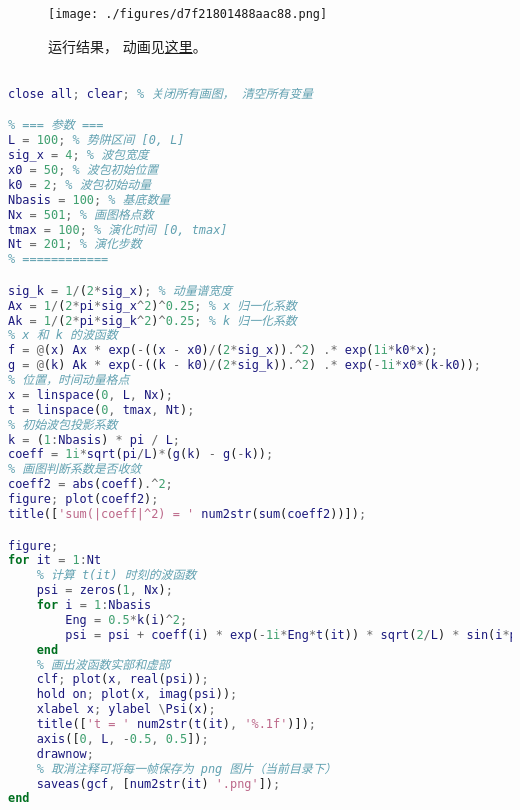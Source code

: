 
\begin{issues}
\issueDraft
\end{issues}


\begin{figure}[ht]
\centering
\texttt{[image: ./figures/d7f21801488aac88.png]}
\caption{运行结果， 动画见\href{https://wuli.wiki/apps/wvISW.html}{这里}。} \label{fig_ISWmat_1}
\end{figure}

\begin{lstlisting}[language=matlab, caption=WpkISW.m]
% 无限深势阱中的波包

close all; clear; % 关闭所有画图， 清空所有变量

% === 参数 ===
L = 100; % 势阱区间 [0, L]
sig_x = 4; % 波包宽度
x0 = 50; % 波包初始位置
k0 = 2; % 波包初始动量
Nbasis = 100; % 基底数量
Nx = 501; % 画图格点数
tmax = 100; % 演化时间 [0, tmax]
Nt = 201; % 演化步数
% ============

sig_k = 1/(2*sig_x); % 动量谱宽度
Ax = 1/(2*pi*sig_x^2)^0.25; % x 归一化系数
Ak = 1/(2*pi*sig_k^2)^0.25; % k 归一化系数
% x 和 k 的波函数
f = @(x) Ax * exp(-((x - x0)/(2*sig_x)).^2) .* exp(1i*k0*x);
g = @(k) Ak * exp(-((k - k0)/(2*sig_k)).^2) .* exp(-1i*x0*(k-k0));
% 位置，时间动量格点
x = linspace(0, L, Nx);
t = linspace(0, tmax, Nt);
% 初始波包投影系数
k = (1:Nbasis) * pi / L;
coeff = 1i*sqrt(pi/L)*(g(k) - g(-k));
% 画图判断系数是否收敛
coeff2 = abs(coeff).^2;
figure; plot(coeff2);
title(['sum(|coeff|^2) = ' num2str(sum(coeff2))]);

figure;
for it = 1:Nt
    % 计算 t(it) 时刻的波函数
    psi = zeros(1, Nx);
    for i = 1:Nbasis
        Eng = 0.5*k(i)^2;
        psi = psi + coeff(i) * exp(-1i*Eng*t(it)) * sqrt(2/L) * sin(i*pi*x/L);
    end
    % 画出波函数实部和虚部
    clf; plot(x, real(psi));
    hold on; plot(x, imag(psi));
    xlabel x; ylabel \Psi(x);
    title(['t = ' num2str(t(it), '%.1f')]);
    axis([0, L, -0.5, 0.5]);
    drawnow;
    % 取消注释可将每一帧保存为 png 图片（当前目录下）
    saveas(gcf, [num2str(it) '.png']);
end
\end{lstlisting}
